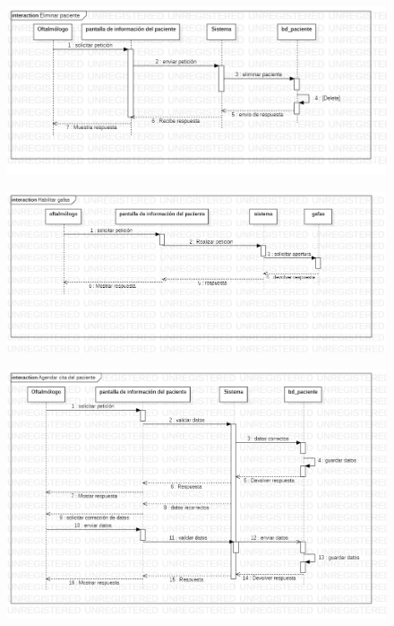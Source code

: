 \documentclass[10pt]{article}
\begin{document}
\begin{figure}[H]
	\begin{center}
\includegraphics[scale = 0.45]{UML/Secuencias/Caso_de_uso_8.jpg} 
	\end{center} 
\end{figure}


\begin{figure}[H]
	\begin{center}
\includegraphics[scale = 0.45]{UML/Secuencias/Caso_de_uso_9.jpg} 
	\end{center} 
\end{figure}


\begin{figure}[H]
	\begin{center}
\includegraphics[scale = 0.45]{UML/Secuencias/Caso_de_uso_10.jpg} 
	\end{center} 
\end{figure}
\end{document}
